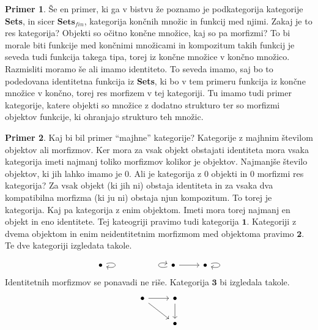 \documentclass[12pt,a4paper]{book}
\theoremstyle{definition}
\theoremstyle{plain}
\theoremstyle{definition}
\newtheorem{primer}{Primer}[section]
\theoremstyle{remark}
\newcommand{\cat}[1]{\textbf{#1}}
\begin{document}
\begin{primer}
Še en primer, ki ga v bistvu že poznamo je podkategorija kategorije \cat{Sets}, in sicer $\cat{Sets}_{fin}$, kategorija končnih množic in funkcij med njimi. Zakaj je to res kategorija? Objekti so očitno končne množice, kaj so pa morfizmi? 
To bi morale biti funkcije med končnimi množicami in kompozitum takih funkcij je seveda tudi funkcija takega tipa, torej iz končne množice v končno množico. Razmisliti moramo še ali imamo identiteto. To seveda imamo, saj bo to podedovana identitetna funkcija iz \cat{Sets}, ki bo v tem primeru funkcija iz končne množice v končno, torej res morfizem v tej kategoriji. Tu imamo tudi primer kategorije, katere objekti so množice z dodatno strukturo ter so morfizmi objektov funkcije, ki ohranjajo strukturo teh množic.
\end{primer}

\begin{primer}
Kaj bi bil primer "`majhne"' kategorije? Kategorije z majhnim številom objektov ali morfizmov. Ker mora za vsak objekt obstajati identiteta mora vsaka kategorija imeti najmanj toliko morfizmov kolikor je objektov. Najmanjše število objektov, ki jih lahko imamo je 0. Ali je kategorija z 0 objekti in 0 morfizmi res kategorija? Za vsak objekt (ki jih ni) obstaja identiteta in za vsaka dva kompatibilna morfizma (ki ju ni) obstaja njun kompozitum. To torej je kategorija. Kaj pa kategorija z enim objektom. Imeti mora torej najmanj en objekt in eno identitete. Tej kateogriji pravimo tudi kategorija $\mathbf{1}$. Kategoriji z dvema objektom in enim neidentitetnim morfizmom med objektoma pravimo $\mathbf{2}$. Te dve kategoriji izgledata takole.

\begin{equation}
\begin{tikzcd}
\bullet \arrow[loop right] &&&  \arrow[loop left] \bullet \arrow[r] & \bullet \arrow[loop right]
\end{tikzcd}
\end{equation}
%
Identitetnih morfizmov se ponavadi ne riše. Kategorija $\cat{3}$ bi izgledala takole.
%
\begin{equation}
\begin{tikzcd}
\bullet \arrow[r] \arrow[rd] & \bullet \arrow[d] \\
& \bullet
\end{tikzcd}
\end{equation}
\end{primer}
\end{document}
